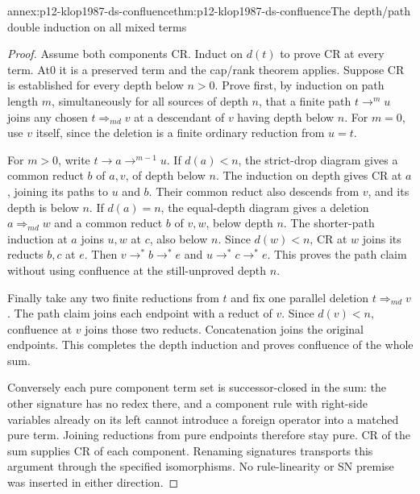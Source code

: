 \begin{annexitem}{annex:p12-klop1987-ds-confluence}{thm:p12-klop1987-ds-confluence}{The depth/path double induction on all mixed terms}
\begin{proof}
Assume both components CR. Induct on \(d(t)\) to prove CR at
every term. At0 it is a preserved term and the cap/rank theorem
applies. Suppose CR is established for every depth below \(n>0\).
Prove first, by induction on path length \(m\), simultaneously
for all sources of depth \(n\), that a finite path
\(t\to^m u\) joins any chosen \(t\Rightarrow_{
m d}v\)
at a descendant of \(v\) having depth below \(n\).
For \(m=0\), use \(v\) itself, since the deletion is a finite
ordinary reduction from \(u=t\).

For \(m>0\), write \(t\to a\to^{m-1}u\).
If \(d(a)<n\), the strict-drop diagram gives a common reduct
\(b\) of \(a,v\), of depth below \(n\).
The induction on depth gives CR at \(a\), joining its paths
to \(u\) and \(b\). Their common reduct also descends from
\(v\), and its depth is below \(n\).
If \(d(a)=n\), the equal-depth diagram gives a deletion
\(a\Rightarrow_{
m d}w\) and a common reduct \(b\) of
\(v,w\), below depth \(n\). The shorter-path induction at
\(a\) joins \(u,w\) at \(c\), also below \(n\).
Since \(d(w)<n\), CR at \(w\) joins its reducts \(b,c\)
at \(e\). Then \(v\to^*b\to^*e\) and
\(u\to^*c\to^*e\). This proves the path claim without
using confluence at the still-unproved depth \(n\).

Finally take any two finite reductions from \(t\) and fix one
parallel deletion \(t\Rightarrow_{
m d}v\).
The path claim joins each endpoint with a reduct of \(v\).
Since \(d(v)<n\), confluence at \(v\) joins those two reducts.
Concatenation joins the original endpoints. This completes the
depth induction and proves confluence of the whole sum.

Conversely each pure component term set is successor-closed in
the sum: the other signature has no redex there, and a component
rule with right-side variables already on its left cannot introduce
a foreign operator into a matched pure term. Joining reductions
from pure endpoints therefore stay pure. CR of the sum supplies
CR of each component. Renaming signatures transports this argument
through the specified isomorphisms. No rule-linearity or SN premise
was inserted in either direction.
\end{proof}
\end{annexitem}

